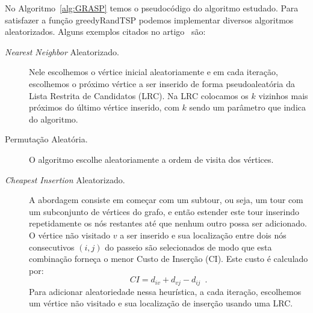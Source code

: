 \documentclass[12pt, a4paper]{article}
\begin{document}
No Algoritmo~\ref{alg:GRASP} temos o pseudocódigo do algoritmo estudado. Para satisfazer a função greedyRandTSP podemos implementar diversos algoritmos aleatorizados. Alguns exemplos citados no artigo~\cite{ha2018min} são: %
\begin{description}
	\item [\textit{Nearest Neighbor} Aleatorizado.] Nele escolhemos o vértice inicial aleatoriamente e em cada iteração, escolhemos o próximo vértice a ser inserido de forma pseudoaleatória da Lista Restrita de Candidatos (LRC). Na LRC colocamos os $k$ vizinhos mais próximos do último vértice inserido, com $k$ sendo um parâmetro que indica do algoritmo.
	
	\item [Permutação Aleatória.] O algoritmo escolhe aleatoriamente a ordem de visita dos vértices. 
	
	\item [\textit{Cheapest Insertion} Aleatorizado.] A abordagem consiste em começar com um subtour, ou seja, um tour com um subconjunto de vértices do grafo, e então estender este tour 
inserindo repetidamente os nós restantes até que nenhum outro possa ser adicionado. 
O vértice não visitado $v$ a ser inserido e sua localização entre dois nós consecutivos $(i,j)$ do passeio são selecionados de modo que esta combinação forneça o menor Custo de Inserção (CI).
Este custo é calculado por: $$ CI = d_{iv} + d_{vj} - d_{ij} \enspace.$$
Para adicionar aleatoriedade nessa heurística, a cada iteração, escolhemos um vértice não visitado e sua localização de inserção usando uma LRC.

	
	
\end{description}
\end{document}
